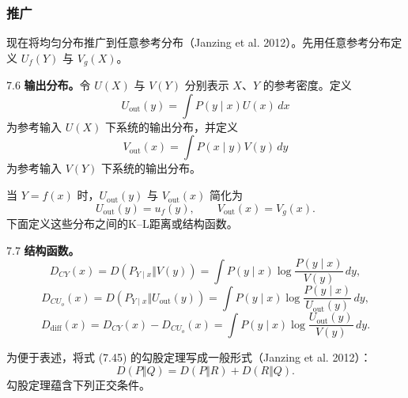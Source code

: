 \subsubsection{推广}
现在将均匀分布推广到任意参考分布（Janzing et al. 2012）。先用任意参考分布定义 $U_f(Y)$ 与 $V_g(X)$。

\begin{bookdefinition}{7.6}
\textbf{输出分布。}令 $U(X)$ 与 $V(Y)$ 分别表示 $X$、$Y$ 的参考密度。定义
\begin{equation}
U_{\mathrm{out}}(y)=\int P(y\mid x)U(x)\,dx
\tag{7.55}
\end{equation}
为参考输入 $U(X)$ 下系统的输出分布，并定义
\begin{equation}
V_{\mathrm{out}}(x)=\int P(x\mid y)V(y)\,dy
\tag{7.56}
\end{equation}
为参考输入 $V(Y)$ 下系统的输出分布。
\end{bookdefinition}
当 $Y=f(x)$ 时，$U_{\mathrm{out}}(y)$ 与 $V_{\mathrm{out}}(x)$ 简化为
\begin{equation}
U_{\mathrm{out}}(y)=u_f(y),\qquad V_{\mathrm{out}}(x)=V_g(x).
\tag{7.57}
\end{equation}
下面定义这些分布之间的K–L距离或结构函数。

\begin{bookdefinition}{7.7}
\textbf{结构函数。}
\begin{equation}
D_{CY}(x)=D(P_{Y\mid x}\Vert V(y))
=\int P(y\mid x)\log\frac{P(y\mid x)}{V(y)}\,dy,
\tag{7.58}
\end{equation}
\begin{equation}
D_{CU_o}(x)=D(P_{Y\mid x}\Vert U_{\mathrm{out}}(y))
=\int P(y\mid x)\log\frac{P(y\mid x)}{U_{\mathrm{out}}(y)}\,dy,
\tag{7.59}
\end{equation}
\begin{equation}
D_{\mathrm{diff}}(x)=D_{CY}(x)-D_{CU_o}(x)
=\int P(y\mid x)\log\frac{U_{\mathrm{out}}(y)}{V(y)}\,dy.
\tag{7.60}
\end{equation}
\end{bookdefinition}

为便于表述，将式 (7.45) 的勾股定理写成一般形式（Janzing et al. 2012）：
\begin{equation}
D(P\Vert Q)=D(P\Vert R)+D(R\Vert Q).
\tag{7.61}
\end{equation}
勾股定理蕴含下列正交条件。

